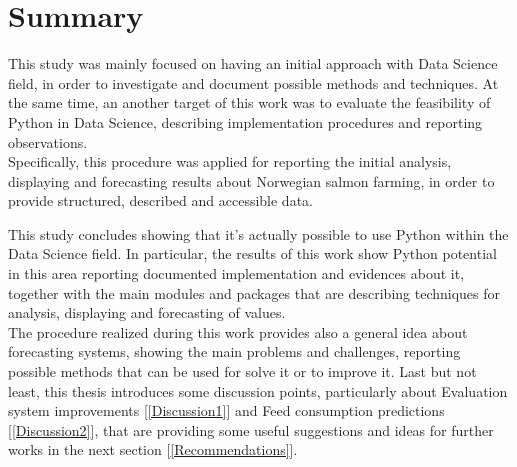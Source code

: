 
\section{Summary}

This study was mainly focused on having an initial approach with Data Science field, in order to investigate and document possible methods and techniques. At the same time, an another target of this work was to evaluate the feasibility of Python in Data Science, describing implementation procedures and reporting observations. \\
Specifically, this procedure was applied for reporting the initial analysis, displaying and forecasting results about Norwegian salmon farming, in order to provide structured, described and accessible data.

This study concludes showing that it's actually possible to use Python within the Data Science field. In particular, the results of this work show Python potential in this area reporting documented implementation and evidences about it, together with the main modules and packages that are describing techniques for analysis, displaying and forecasting of values.\\ 
The procedure realized during this work provides also a general idea about forecasting systems, showing the main problems and challenges, reporting possible methods that can be used for solve it or to improve it. 
Last but not least, this thesis introduces some discussion points, particularly about Evaluation system improvements [\ref{Discussion1}] and Feed consumption predictions [\ref{Discussion2}], that are providing some useful suggestions and ideas for further works in the next section [\ref{Recommendations}].

\newpage

